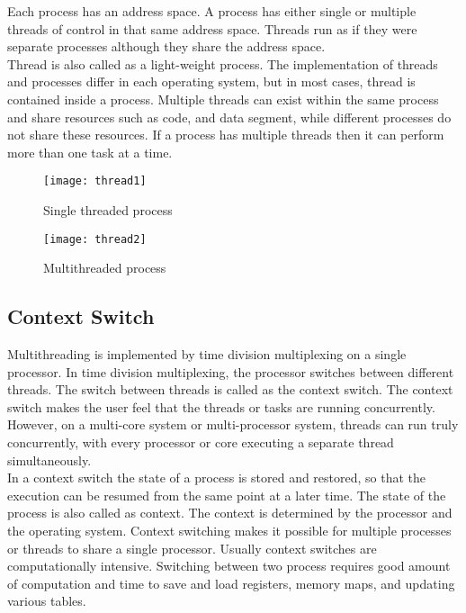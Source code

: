 Each process has an address space. A process has either single or multiple threads of control in that same address space. Threads run as if they were separate processes although they share the address space. \cite{Galvin}
\\
Thread is also called as a light-weight process. The implementation of threads and processes differ in each operating system, but in most cases, thread is contained inside a process. Multiple threads can exist within the same process and share resources such as code, and data segment, while different processes do not share these resources. If a process has multiple threads then it can perform more than one task at a time. 

\begin{figure}[!ht]
\centering
\texttt{[image: thread1]}
\caption{Single threaded process}
\label{fig:thread1}
\end{figure}

\begin{figure}[!ht]
\centering
\texttt{[image: thread2]}
\caption{Multithreaded process}
\label{fig:thread2}
\end{figure}

\subsection{Context Switch}

Multithreading is implemented by time division multiplexing on a single processor. In time division multiplexing, the processor switches between different threads. The switch between threads is called as the context switch. The context switch makes the user feel that the threads or tasks are running concurrently. However, on a multi-core system or multi-processor system, threads can run truly concurrently, with every processor or core executing a separate thread simultaneously. 
\\
In a context switch the state of a process is stored and restored, so that the execution can be resumed from the same point at a later time. The state of the process is also called as context. The context is determined by the processor and the operating system. Context switching makes it possible for multiple processes or threads to share a single processor. Usually context switches are computationally intensive. Switching between two process requires good amount of computation and time to save and load registers, memory maps, and updating various tables.\cite{Galvin} 

